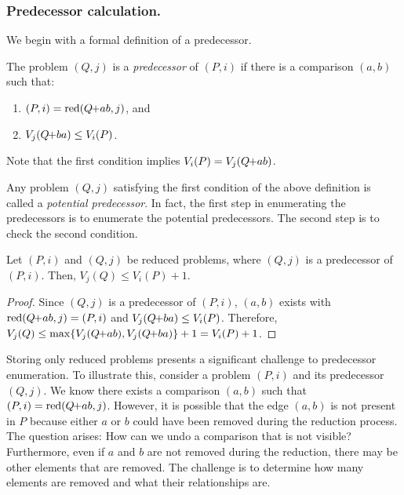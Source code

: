 \documentclass[a4paper,UKenglish,cleveref, autoref, thm-restate, anonymous]{lipics-v2021}
\newcommand{\pchild}[3]{{#1}\kern-1pt{+}{#2}{#3}}
\newcommand{\reduced}[1]{\operatorname{red}#1}
\begin{document}
\subsubsection{Predecessor calculation.} \label{sec:backward:predecessor_calculation}
We begin with a formal definition of a predecessor.

\begin{definition}[Predecessor] \label{definition:predecessor_calculation}
  The problem $(Q, j)$ is a \emph{predecessor} of $(P, i)$ if there is a comparison $(a, b)$ such that:
  \begin{enumerate}
    \item $(P, i) = \reduced(\pchild{Q}{a}{b}, j)$, and
    \item $V_j(\pchild{Q}{b}{a}) \leq V_i(P)$.
  \end{enumerate}
\end{definition}

Note that the first condition implies $V_i(P) = V_j(\pchild{Q}{a}{b})$.

Any problem $(Q, j)$ satisfying the first condition of the above definition is called a \emph{potential predecessor}.
In fact, the first step in enumerating the predecessors is to enumerate the potential predecessors.
The second step is to check the second condition.

\begin{lemma} \label{lemma:predecessor_calculation}
  Let $(P, i)$ and $(Q, j)$ be reduced problems, where $(Q, j)$ is a predecessor of $(P, i)$.
  Then, $V_j(Q) \leq V_i(P) + 1$.
\end{lemma}

\begin{proof} \label{proof:predecessor_calculation}
  Since $(Q, j)$ is a predecessor of $(P, i)$, $(a, b)$ exists with $\reduced{(\pchild{Q}{a}{b}, j)} = (P, i)$ and $V_j(\pchild{Q}{b}{a}) \leq V_i(P)$.
  Therefore, $V_j(Q) \leq \max\{V_j(\pchild{Q}{a}{b}), V_j(\pchild{Q}{b}{a})\} + 1 = V_i(P) + 1$.
\end{proof}

Storing only reduced problems presents a significant challenge to predecessor enumeration.
To illustrate this, consider a problem $(P, i)$ and its predecessor $(Q, j)$.
We know there exists a comparison $(a, b)$ such that $(P, i) = \reduced(\pchild{Q}{a}{b}, j)$.
However, it is possible that the edge $(a, b)$ is not present in $P$ because either $a$ or $b$ could have been removed during the reduction process.
The question arises: How can we undo a comparison that is not visible?
Furthermore, even if $a$ and $b$ are not removed during the reduction, there may be other elements that are removed.
The challenge is to determine how many elements are removed and what their relationships are.
\end{document}
